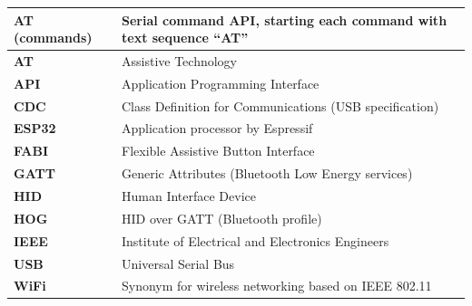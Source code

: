 \documentclass[]{scrreprt}%
\begin{document}
 \begin{tabularx}{\textwidth}{|l|X|} \hline
 \textbf{AT (commands)}   &   Serial command API, starting each command with text sequence ``AT''\\ \hline
 \textbf{AT}    &   Assistive Technology \\ \hline
 \textbf{API}   &   Application Programming Interface      \\ \hline
 \textbf{CDC}   &   Class Definition for Communications (USB specification) \\ \hline
 \textbf{ESP32} &   Application processor by Espressif \\ \hline
 \textbf{FABI}  &   Flexible Assistive Button Interface \\ \hline
 \textbf{GATT}  &   Generic Attributes (Bluetooth Low Energy services) \\ \hline
 \textbf{HID}   &   Human Interface Device      \\ \hline
 \textbf{HOG}   &   HID over GATT (Bluetooth profile) \\ \hline
 \textbf{IEEE}  &   Institute of Electrical and Electronics Engineers \\ \hline
 \textbf{USB}   &   Universal Serial Bus \\ \hline
 \textbf{WiFi}  &   Synonym for wireless networking based on IEEE 802.11 \\ \hline
 \end{tabularx}
\end{document}
